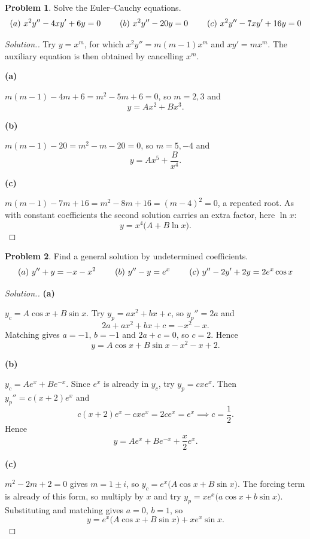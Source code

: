 \documentclass[11pt,a4paper]{article}
\theoremstyle{definition}
\newtheorem{problemx}{Problem}[subsection]
\newenvironment{problem}{\begin{problemx}}{\end{problemx}}
\newenvironment{solution}
  {\renewcommand{\qedsymbol}{}\begin{proof}[\textit{Solution}.]}
  {\end{proof}}
\newcommand{\subhead}[1]{%
  \par\medskip\noindent\textbf{#1}\par\nobreak\smallskip}
\begin{document}
\begin{problem}
Solve the Euler--Cauchy equations.
$$(a)\ x^2y''-4xy'+6y = 0\hspace{0.8cm}(b)\ x^2y''-20y = 0
\hspace{0.8cm}(c)\ x^2y''-7xy'+16y = 0$$
\end{problem}
\begin{solution}
Try $y = x^m$, for which $x^2y'' = m(m-1)x^m$ and $xy' = mx^m$. The auxiliary
equation is then obtained by cancelling $x^m$.

\subhead{(a)} $m(m-1)-4m+6 = m^2-5m+6 = 0$, so $m = 2,3$ and
$$y = Ax^2 + Bx^3 .$$

\subhead{(b)} $m(m-1)-20 = m^2-m-20 = 0$, so $m = 5,-4$ and
$$y = Ax^5 + \frac{B}{x^4}.$$

\subhead{(c)} $m(m-1)-7m+16 = m^2-8m+16 = (m-4)^2 = 0$, a repeated root. As with
constant coefficients the second solution carries an extra factor, here
$\ln x$:
$$y = x^4\big(A + B\ln x\big).$$
\end{solution}

\begin{problem}
Find a general solution by undetermined coefficients.
$$(a)\ y''+y = -x-x^2\hspace{0.8cm}(b)\ y''-y = e^{x}
\hspace{0.8cm}(c)\ y''-2y'+2y = 2e^{x}\cos x$$
\end{problem}
\begin{solution}
\subhead{(a)}
$y_c = A\cos x + B\sin x$. Try $y_p = ax^2+bx+c$, so $y_p'' = 2a$ and
$$2a + ax^2+bx+c = -x^2-x .$$
Matching gives $a = -1$, $b = -1$ and $2a+c = 0$, so $c = 2$. Hence
$$y = A\cos x + B\sin x - x^2 - x + 2 .$$

\subhead{(b)}
$y_c = Ae^{x}+Be^{-x}$. Since $e^{x}$ is already in $y_c$, try
$y_p = cxe^{x}$. Then $y_p'' = c(x+2)e^x$ and
$$c(x+2)e^x - cxe^x = 2ce^x = e^x \implies c = \frac12 .$$
Hence
$$y = Ae^{x} + Be^{-x} + \frac{x}{2}e^{x}.$$

\subhead{(c)}
$m^2-2m+2 = 0$ gives $m = 1\pm i$, so
$y_c = e^{x}\big(A\cos x + B\sin x\big)$. The forcing term is already of this
form, so multiply by $x$ and try
$y_p = xe^{x}\big(a\cos x + b\sin x\big)$. Substituting and matching gives
$a = 0$, $b = 1$, so
$$y = e^{x}\big(A\cos x + B\sin x\big) + xe^{x}\sin x .$$
\end{solution}
\end{document}
